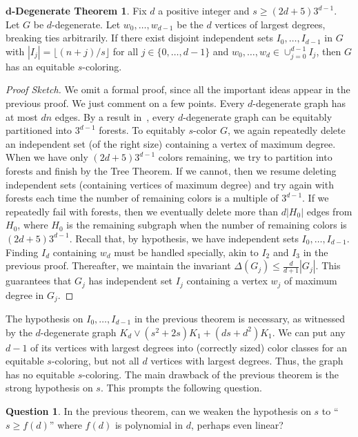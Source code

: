 \documentclass[11pt]{article}
\theoremstyle{definition}
\newtheorem{myques}[lem]{Question}
\newtheorem*{dthm}{$\bm{d}$-Degenerate Theorem}
\newcommand\floor[1]{\lfloor#1\rfloor}
\renewcommand\ge\geqslant
\renewcommand\le\leqslant
\begin{document}
\begin{dthm}
	Fix $d$ a positive integer and $s\ge (2d+5)3^{d-1}$.  Let $G$ be $d$-degenerate.  Let $w_0,\ldots,w_{d-1}$ be the $d$ vertices of largest 
	degrees, breaking ties arbitrarily.  If there exist disjoint independent sets $I_0,\ldots,I_{d-1}$ in $G$ with $|I_j| = \floor{(n+j)/s}$ for
	all $j\in\{0,\ldots,d-1\}$ and $w_0,\ldots,w_d\in\cup_{j=0}^{d-1}I_j$, then $G$ has an equitable $s$-coloring.
\end{dthm}
\begin{proof}[Proof Sketch]
	We omit a formal proof, since all the important ideas appear in the previous proof.  We just comment on a few points.  Every $d$-degenerate
	graph has at most $dn$ edges.  By a result in~\cite{KNP}, every $d$-degenerate graph can be equitably partitioned into $3^{d-1}$ forests.
	To equitably $s$-color $G$, we again repeatedly delete an independent set (of the right size) containing a vertex of maximum degree.  
	When we have only $(2d+5)3^{d-1}$
	colors remaining, we try to partition into forests and finish by the Tree Theorem.  If we cannot, then we resume deleting independent sets
	(containing vertices of maximum degree) and try again with forests each time the number of remaining colors is a multiple of $3^{d-1}$.  If we 
	repeatedly fail with forests, then we eventually delete more than $d|H_0|$ edges from $H_0$, where $H_0$ is the remaining subgraph when 
	the number of remaining colors is $(2d+5)3^{d-1}$.  Recall that, by hypothesis, we have independent sets 
	$I_0,\ldots, I_{d-1}$.  Finding $I_d$ containing $w_d$ must be handled specially, akin to $I_2$ and $I_3$ in the previous proof.
	Thereafter, we maintain the invariant $\Delta(G_j)\le \frac{d}{d+1}|G_j|$.  This guarantees that $G_j$ has independent set 
	$I_j$ containing a vertex $w_j$ of maximum degree in $G_j$.
\end{proof}

The hypothesis on $I_0,\ldots,I_{d-1}$ in the previous theorem is necessary, as witnessed by the $d$-degenerate graph $K_d\vee (s^2+2s)K_1+(ds+d^2)K_1$.  
We can put any $d-1$ of its vertices with largest degrees into (correctly sized) color classes for an equitable $s$-coloring, but not all $d$ vertices 
with largest degrees.  Thus, the graph has no equitable $s$-coloring.
%
The main drawback of the previous theorem is the strong hypothesis on $s$.  This prompts the following question.

\begin{myques}
	In the previous theorem, can we weaken the hypothesis on $s$ to ``$s\ge f(d)$'' where $f(d)$ is polynomial in $d$, perhaps even linear?
\end{myques}
\end{document}
